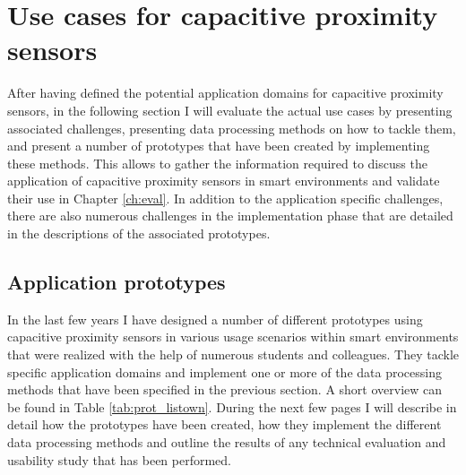\chapter{Use cases for capacitive proximity sensors}
\label{ch:usecases}
After having defined the potential application domains for capacitive proximity sensors, in the following section I will evaluate the actual use cases by presenting associated challenges, presenting data processing methods on how to tackle them, and present a number of prototypes that have been created by implementing these methods. This allows to gather the information required to discuss the application of capacitive proximity sensors in smart environments and validate their use in Chapter \ref{ch:eval}. In addition to the application specific challenges, there are also numerous challenges in the implementation phase that are detailed in the descriptions of the associated prototypes.




\clearpage

\section{Application prototypes}
In the last few years I have designed a number of different prototypes using capacitive proximity sensors in various usage scenarios within smart environments that were realized with the help of numerous students and colleagues. They tackle specific application domains and implement one or more of the data processing methods that have been specified in the previous section. A short overview can be found in Table \ref{tab:prot_listown}. During the next few pages I will describe in detail how the prototypes have been created, how they implement the different data processing methods and outline the results of any technical evaluation and usability study that has been performed.

